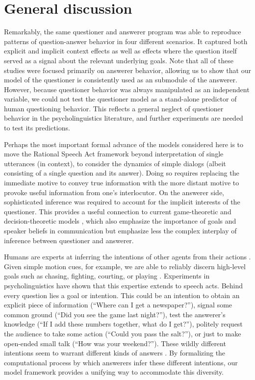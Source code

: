 \documentclass[10pt,letterpaper]{article}
\begin{document}
\section{General discussion}
\label{sec:gd}

Remarkably, the same questioner and answerer program was able to reproduce patterns of question-answer behavior in four different scenarios. It captured both explicit and implicit context effects as well as effects where the question itself served as a signal about the relevant underlying goals. Note that all of these studies were focused primarily on answerer behavior, allowing us to show that our model of the questioner is consistently used as an submodule of the answerer. However, because questioner behavior was always manipulated as an independent variable, we could not test the questioner model as a stand-alone predictor of human questioning behavior. This reflects a general neglect of questioner behavior in the psycholinguistics literature, and further experiments are needed to test its predictions.

Perhaps the most important formal advance of the models considered here is to move the Rational Speech Act framework beyond interpretation of single utterances (in context), to consider the dynamics of simple dialogs (albeit consisting of a single question and its answer). 
Doing so requires replacing the immediate motive to convey true information with the more distant motive to provoke useful information from one's interlocutor. On the answerer side, sophisticated inference was required to account for the implicit interests of the questioner. This provides a useful connection to current game-theoretic and decision-theoretic models \cite{VogelBodoiaPottsJurafsky13_EmergenceGricean, VanRooy03_QuestioningDecisionProblems}, which also emphasize the importance of goals and speaker beliefs in communication but emphasize less the complex interplay of inference between questioner and answerer.

Humans are experts at inferring the intentions of other agents from their actions \cite{TomaselloCarpenter___Moll05_IntentionsCulturalCognition}. Given simple motion cues, for example, we are able to reliably discern high-level goals such as chasing, fighting, courting, or playing \cite{BarrettToddMillerBlythe05_IntentionFromMotionCues, HeiderSimmel44_ApparentBehavior}. Experiments in psycholinguistics have shown that this expertise extends to speech acts.  Behind every question lies a goal or intention. This could be an intention to obtain an explicit piece of information (``Where can I get a newspaper?''), signal some common ground (``Did you see the game last night?''), test the answerer's knowledge (``If I add these numbers together, what do I get?''), politely request the audience to take some action (``Could you pass the salt?''), or just to make open-ended small talk (``How was your weekend?''). These wildly different intentions seem to warrant different kinds of answers%
. By formalizing the computational process by which answerers infer these different intentions, our model framework provides a unifying way to accommodate this diversity.  %



\setlength{\bibleftmargin}{.125in}
\setlength{\bibindent}{-\bibleftmargin}


\end{document}
